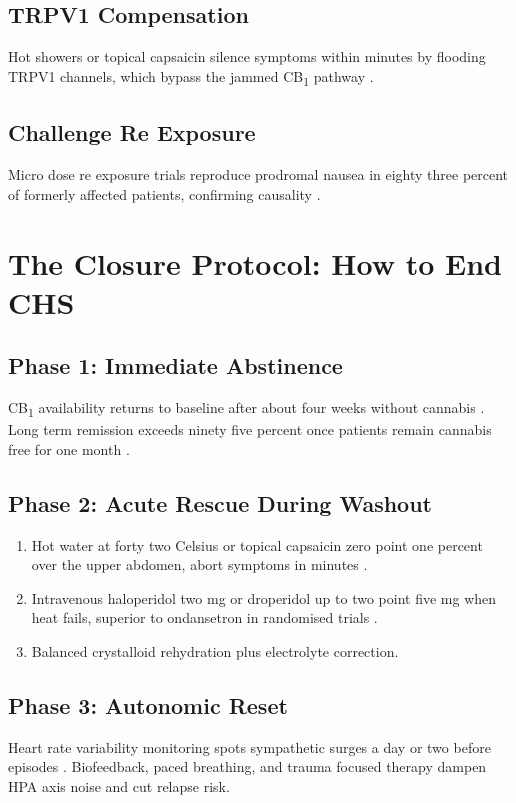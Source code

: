 \documentclass[11pt]{article}
\begin{document}
\subsection{TRPV1 Compensation}
Hot showers or topical capsaicin silence symptoms within minutes by flooding TRPV1 channels, which bypass the jammed CB\textsubscript{1} pathway \cite{capsaicin2019}.

\subsection{Challenge Re Exposure}
Micro dose re exposure trials reproduce prodromal nausea in eighty three percent of formerly affected patients, confirming causality \cite{lapoint2015}.

\section{The Closure Protocol: How to End CHS}
\subsection{Phase 1: Immediate Abstinence}
CB\textsubscript{1} availability returns to baseline after about four weeks without cannabis \cite{dsouza2016}. Long term remission exceeds ninety five percent once patients remain cannabis free for one month \cite{lapoint2015}.

\subsection{Phase 2: Acute Rescue During Washout}
\begin{enumerate}
\item Hot water at forty two Celsius or topical capsaicin zero point one percent over the upper abdomen, abort symptoms in minutes \cite{capsaicin2019}.
\item Intravenous haloperidol two mg or droperidol up to two point five mg when heat fails, superior to ondansetron in randomised trials \cite{haloperidol2020,droperidol2021}.
\item Balanced crystalloid rehydration plus electrolyte correction.
\end{enumerate}

\subsection{Phase 3: Autonomic Reset}
Heart rate variability monitoring spots sympathetic surges a day or two before episodes \cite{effectsHRV2010}. Biofeedback, paced breathing, and trauma focused therapy dampen HPA axis noise and cut relapse risk.
\end{document}
